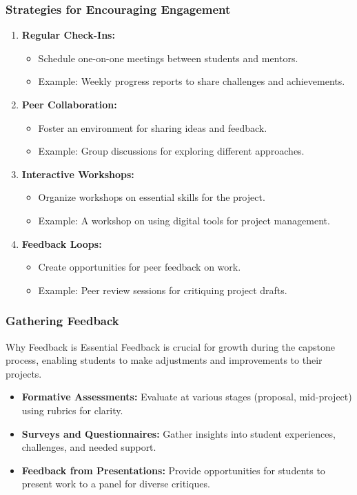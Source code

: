 \documentclass[aspectratio=169]{beamer}
\begin{document}
\begin{frame}[fragile]
    \frametitle{Strategies for Encouraging Engagement}
    \begin{enumerate}
        \item \textbf{Regular Check-Ins:}
            \begin{itemize}
                \item Schedule one-on-one meetings between students and mentors.
                \item Example: Weekly progress reports to share challenges and achievements.
            \end{itemize}
        \item \textbf{Peer Collaboration:}
            \begin{itemize}
                \item Foster an environment for sharing ideas and feedback.
                \item Example: Group discussions for exploring different approaches.
            \end{itemize}
        \item \textbf{Interactive Workshops:}
            \begin{itemize}
                \item Organize workshops on essential skills for the project.
                \item Example: A workshop on using digital tools for project management.
            \end{itemize}
        \item \textbf{Feedback Loops:}
            \begin{itemize}
                \item Create opportunities for peer feedback on work.
                \item Example: Peer review sessions for critiquing project drafts.
            \end{itemize}
    \end{enumerate}
\end{frame}

\begin{frame}[fragile]
    \frametitle{Gathering Feedback}
    \begin{block}{Why Feedback is Essential}
        Feedback is crucial for growth during the capstone process, enabling students to make adjustments and improvements to their projects.
    \end{block}
    \begin{itemize}
        \item \textbf{Formative Assessments:} Evaluate at various stages (proposal, mid-project) using rubrics for clarity.
        \item \textbf{Surveys and Questionnaires:} Gather insights into student experiences, challenges, and needed support.
        \item \textbf{Feedback from Presentations:} Provide opportunities for students to present work to a panel for diverse critiques.
    \end{itemize}
\end{frame}
\end{document}
